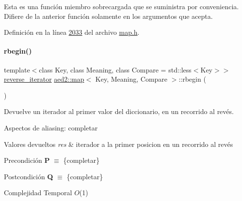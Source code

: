 Esta es una función miembro sobrecargada que se suministra por conveniencia. Difiere de la anterior función solamente en los argumentos que acepta. 

Definición en la línea \hyperlink{map_8h_source_l02033}{2033} del archivo \hyperlink{map_8h_source}{map.\+h}.

\mbox{\label{classaed2_1_1map_ac412d3902112122c1bffe2d4283a4e9d_ac412d3902112122c1bffe2d4283a4e9d}} 
\paragraph{\texorpdfstring{rbegin()}{rbegin()}\hspace{0.1cm}{\footnotesize\ttfamily [1/2]}}
{\footnotesize\ttfamily template$<$class Key, class Meaning, class Compare = std\+::less$<$\+Key$>$$>$ \\
\hyperlink{classaed2_1_1map_a8e6a592062260177fd73b2f9897b1dd5_a8e6a592062260177fd73b2f9897b1dd5}{reverse\+\_\+iterator} \hyperlink{classaed2_1_1map}{aed2\+::map}$<$ Key, Meaning, Compare $>$\+::rbegin (\begin{DoxyParamCaption}{ }\end{DoxyParamCaption})\hspace{0.3cm}{\ttfamily [inline]}}



Devuelve un iterador al primer valor del diccionario, en un recorrido al revés. 

\begin{DoxyParagraph}{Aspectos de aliasing\+:}
completar
\end{DoxyParagraph}

\begin{DoxyRetVals}{Valores devueltos}
{\em res} & iterador a la primer posicion en un recorrido al revés\\
\hline
\end{DoxyRetVals}
\begin{DoxyPrecond}{Precondición}
{\bfseries P} $\equiv$ \{completar\} 
\end{DoxyPrecond}
\begin{DoxyPostcond}{Postcondición}
{\bfseries Q} $\equiv$ \{completar\}
\end{DoxyPostcond}

\begin{DoxyDescription}
\item[Complejidad Temporal]$O$(1)
\end{DoxyDescription}

